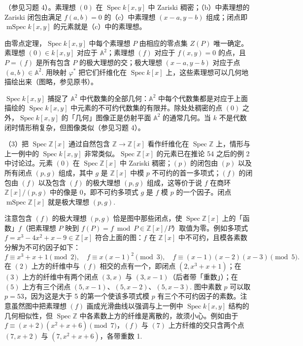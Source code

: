 （参见习题 4）。素理想 \((0)\) 在 \(\operatorname{Spec}k[x,y]\) 中 Zariski 稠密；（b）中素理想的 Zariski 闭包由满足 \(f(a,b) = 0\) 的（c）中素理想 \((x-a,y-b)\) 组成；闭点即 \(\operatorname{mSpec}k[x,y]\) 的元素就是（c）中的素理想。

由零点定理，\(\operatorname{Spec}k[x,y]\) 中每个素理想 \(P\) 由相应的零点集 \(Z(P)\) 唯一确定。素理想 \((0) \in k[x,y]\) 对应于 \(\mathbb{A}^2\)；素理想 \((f)\) 对应于 \(f(x,y) = 0\) 的点，且 \(P = (f)\) 是所有包含 \(P\) 的极大理想的交；极大理想 \((x-a,y-b)\) 对应于点 \((a,b) \in \mathbb{A}^2\). 用映射 \(\varphi^*\) 把它们纤维化在 \(\operatorname{Spec}k[x]\) 上，这些素理想可以几何地描绘出来（图略，参见原书）。

\(\operatorname{Spec}k[x,y]\) 捕捉了 \(\mathbb{A}^2\) 中代数集的全部几何：\(\mathbb{A}^2\) 中每个代数集都是对应于上面描绘的 \(\operatorname{Spec}k[x,y]\) 中元素的不可约代数集的有限并。除处处稠密的点 \((0)\) 之外，\(\operatorname{Spec}k[x,y]\) 的「几何」图像正是仿射平面 \(\mathbb{A}^2\) 的通常几何。当 \(k\) 不是代数闭时情形稍复杂，但图像类似（参见习题 4）。

（3）把 \(\operatorname{Spec}\mathbb{Z}[x]\) 通过自然包含 \(\mathbb{Z} \to \mathbb{Z}[x]\) 看作纤维化在 \(\operatorname{Spec}\mathbb{Z}\) 上，情形与上一例中的 \(\operatorname{Spec}k[x,y]\) 非常类似。\(\operatorname{Spec}\mathbb{Z}[x]\) 的元素已在推论 54 之后的例 2 中讨论过。元素 \((0)\) 在 \(\operatorname{Spec}\mathbb{Z}[x]\) 中 Zariski 稠密；\((p)\) 的闭包由 \((p)\) 以及所有闭点 \((p,g)\) 组成，其中 \(g\) 是 \(\mathbb{Z}[x]\) 中模 \(p\) 不可约的首一多项式；\((f)\) 的闭包由 \((f)\) 以及包含 \((f)\) 的极大理想 \((p,g)\) 组成，这等价于说 \(f\) 在商环 \(\mathbb{Z}[x]/(p,g)\) 中的像是 0，即不可约多项式 \(g\) 是 \(f\) 模 \(p\) 的一个因子。闭点 \(\operatorname{mSpec}\mathbb{Z}[x]\) 就是极大理想 \((p,g)\).

注意包含 \((f)\) 的极大理想 \((p,g)\) 恰是图中那些闭点，使 \(\operatorname{Spec}\mathbb{Z}[x]\) 上的「函数」\(f\)（把素理想 \(P\) 映到 \(f(P) = f \bmod P \in \mathbb{Z}[x]/P\)）取值为零。例如多项式 \(f = x^3-4x^2+x-9 \in \mathbb{Z}[x]\) 符合上面的图：\(f\) 在 \(\mathbb{Z}[x]\) 中不可约，且模各素数分解为不可约因子如下：
\[
f \equiv x^3+x+1 \pmod 2, \quad f \equiv x(x-1)^2 \pmod 3, \quad f \equiv (x-1)(x-2)(x-3) \pmod 5.
\]
在 \((2)\) 上方的纤维中与 \((f)\) 相交的点有一个，即闭点 \((2, x^3+x+1)\)；在 \((3)\) 上方的纤维中有两个闭点 \((3,x)\) 与 \((3,x-1)\)（后者带「重数」）；在 \((5)\) 上方有三个闭点 \((5,x-1)\)、\((5,x-2)\)、\((5,x-3)\). 图中素数 \(p\) 可以取 \(p = 53\)，因为这是大于 5 的第一个使该多项式模 \(p\) 有三个不可约因子的素数。注意虽然图中把素理想 \((f)\) 画成光滑曲线以强调与上一例中 \(\operatorname{Spec}k[x,y]\) 结构的几何相似性，但 \(\operatorname{Spec}\mathbb{Z}\) 中各素数上方的纤维是离散的，故须小心。例如由于 \(f \equiv (x+2)(x^2+x+6) \pmod 7\)，\((f)\) 与 \((7)\) 上方纤维的交只含两个点 \((7,x+2)\) 与 \((7,x^2+x+6)\)，各带重数 1.

